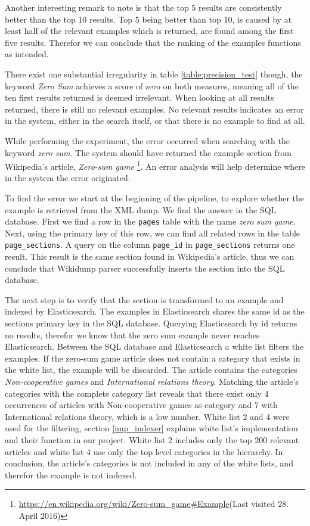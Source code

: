 Another interesting remark to note is that the top 5 results are consistently better than the top 10 results. Top 5 being better than top 10, is caused by at least half of the relevant examples which is returned, are found among the first five results. Therefor we can conclude that the ranking of the examples functions as intended. 

There exist one substantial irregularity in table \ref{table:precision_test} though, the keyword \textit{Zero Sum} achieves a score of zero on both measures, meaning all of the ten first results returned is deemed irrelevant. When looking at all results returned, there is still no relevant examples. No relevant results indicates an error in the system, either in the search itself, or that there is no example to find at all.

While performing the experiment, the error occurred when searching with the keyword \textit{zero sum}. The system should have returned the example section from Wikipedia's article, \textit{Zero-sum game} \footnote{\url{https://en.wikipedia.org/wiki/Zero-sum\_game\#Example}(Last visited 28. April 2016)}. An error analysis will help determine where in the system the error originated. 

To find the error we start at the beginning of the pipeline, to explore whether the example is retrieved from the XML dump. We find the answer in the SQL database. First we find a row in the \texttt{pages} table with the name \textit{zero sum game}. Next, using the primary key of this row, we can find all related rows in the table \texttt{page\_sections}. A query on the column \texttt{page\_id} in \texttt{page\_sections} returns one result. This result is the same section found in Wikipedia's article, thus we can conclude that Wikidump parser successfully inserts the section into the SQL database.

The next step is to verify that the section is transformed to an example and indexed by Elasticsearch. The examples in Elasticsearch shares the same id as the sections primary key in the SQL database. Querying Elasticsearch by id returns no results, therefor we know that the zero sum example never reaches Elasticsearch. Between the SQL database and Elasticsearch a white list filters the examples. If the zero-sum game article does not contain a category that exists in the white list, the example will be discarded. The article contains the categories \textit{Non-cooperative games} and \textit{International relations theory}. Matching the article's categories with the complete category list reveals that there exist only 4 occurrences of articles with Non-cooperative games as category and 7 with International relations theory, which is a low number. White list 2 and 4 were used for the filtering, section \ref{imp_indexer} explains white list's implementation and their function in our project. White list 2 includes only the top 200 relevant articles and white list 4 use only the top level categories in the hierarchy. In conclusion, the article's categories is not included in any of the white lists, and therefor the example is not indexed.

